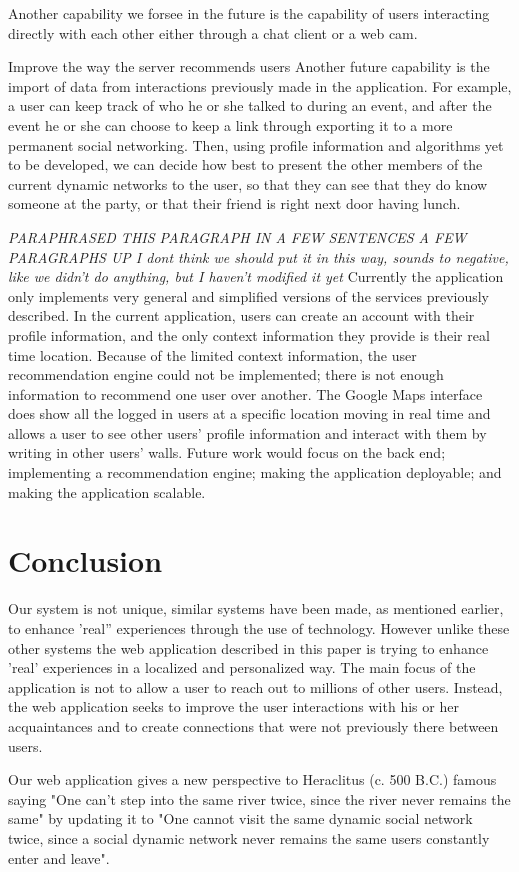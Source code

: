 \documentclass[11pt]{article}
\begin{document}
Another capability we forsee in the future is the capability of users interacting directly with each other either through a chat client or a web cam.

Improve the way the server recommends users
Another future capability is the import of data from interactions previously made in the application. For example, a user can keep track of who he or she talked to during an event, and after the event he or she can choose to keep a link through exporting it to a more permanent social networking. Then, using profile information and algorithms yet to be developed, we can decide how best to present the other members of the current dynamic networks to the user, so that they can see that they do know someone at the party, or that their friend is right next door having lunch.

{\color{red} 
{\it PARAPHRASED THIS PARAGRAPH IN A FEW SENTENCES A FEW PARAGRAPHS UP I dont think we should put it in this way, sounds to negative, like we didn't do anything, but I haven't modified it yet}
Currently the application only implements very general and simplified versions of the services previously described. In the current application, users can create an account with their profile information, and the only context information they provide is their real time location. Because of the limited context information, the user recommendation engine could not be implemented; there is not enough information to recommend one user over another. The Google Maps interface does show all the logged in users at a specific location moving in real time and allows a user to see other users' profile information and interact with them by writing in other users' walls. Future work would focus on the back end; implementing a recommendation engine;  making the application deployable; and making the application scalable.
}


 \section{Conclusion}
 
 Our system is not unique, similar systems have been made, as mentioned earlier, to enhance 'real'' experiences through the use of technology. However unlike these other systems the web application described in this paper is trying to enhance 'real' experiences in a localized and personalized way. The main focus of the application is not to allow a user to reach out to millions of other users. Instead, the web application seeks to improve the user interactions with his or her acquaintances and to create connections that were not previously there between users.   
 
Our web application gives a new perspective to Heraclitus (c. 500 B.C.) famous saying "One can't step into the same river twice, since the river never remains the same" by updating it to "One cannot visit the same dynamic social network twice, since a social dynamic network never remains the same users constantly enter and leave".
\end{document}

